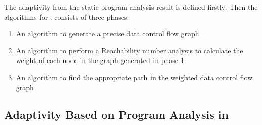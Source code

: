 The adaptivity from the static program analysis result is defined firstly. 
Then the algorithms for {\THESYSTEM}.
{\THESYSTEM} consists of three phases: 
\begin{enumerate}
    \item An algorithm to generate a precise data control flow graph
    \item An algorithm to perform a Reachability number analysis to calculate the weight of each node in the graph generated in phase 1.
    \item An algorithm to find the appropriate path in the weighted data control flow graph
\end{enumerate}
%
\subsection{Adaptivity Based on Program Analysis in \THESYSTEM}
%
